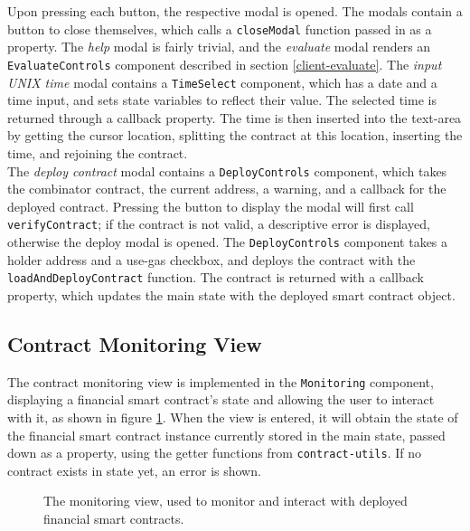 Upon pressing each button, the respective modal is opened. The modals contain a button to close themselves, which calls a \texttt{closeModal} function passed in as a property. The \textit{help} modal is fairly trivial, and the \textit{evaluate} modal renders an \texttt{EvaluateControls} component described in section \ref{client-evaluate}. The \textit{input UNIX time} modal contains a \texttt{TimeSelect} component, which has a date and a time input, and sets state variables to reflect their value. The selected time is returned through a callback property. The time is then inserted into the text-area by getting the cursor location, splitting the contract at this location, inserting the time, and rejoining the contract. \\

The \textit{deploy contract} modal contains a \texttt{DeployControls} component, which takes the combinator contract, the current address, a warning, and a callback for the deployed contract. Pressing the button to display the modal will first call \texttt{verifyContract}; if the contract is not valid, a descriptive error is displayed, otherwise the deploy modal is opened. The \texttt{DeployControls} component takes a holder address and a use-gas checkbox, and deploys the contract with the \texttt{loadAndDeployContract} function. The contract is returned with a callback property, which updates the main state with the deployed smart contract object.


\subsection{Contract Monitoring View}

The contract monitoring view is implemented in the \texttt{Monitoring} component, displaying a financial smart contract's state and allowing the user to interact with it, as shown in figure \ref{fig:monitoring}. When the view is entered, it will obtain the state of the financial smart contract instance currently stored in the main state, passed down as a property, using the getter functions from \texttt{contract-utils}. If no contract exists in state yet, an error is shown. \\

\begin{figure}[h]
    \centering
    \caption{The monitoring view, used to monitor and interact with deployed financial smart contracts.}
    \label{fig:monitoring}
\end{figure}

